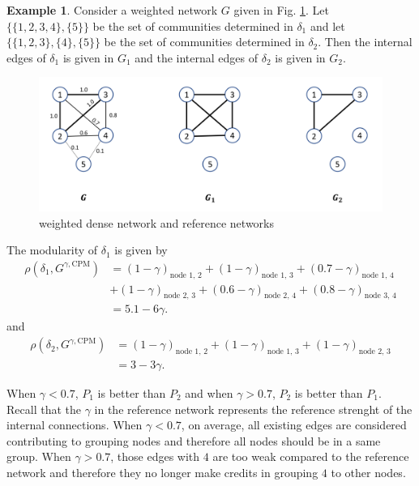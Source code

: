 \documentclass[11pt]{article}
\theoremstyle{definition}
\theoremstyle{definition}
\newtheorem{eg}{Example}
\theoremstyle{definition}
\theoremstyle{remark}
\theoremstyle{plain}
\begin{document}
\begin{eg}\label{eg:weighted-network-CPM}
	Consider a weighted network $G$ given in Fig. \ref{fig:weighted-network}. Let $\{\{1,2,3,4\}, \{5\}\}$ be the set of communities determined in $\delta_1$ and let $\{\{1,2,3\}, \{4\}, \{5\}\}$ be the set of communities determined in $\delta_2$. Then the internal edges of $\delta_1$ is given in $G_1$ and the internal edges of $\delta_2$ is given in $G_2$.

	\begin{figure}[!h]
		\centering
		\includegraphics*[width=.8\textwidth]{weighted-network.PNG}
		\caption{weighted dense network and reference networks}
		\label{fig:weighted-network}
	\end{figure}


	The modularity of $\delta_1$ is given by
	\[
		\begin{aligned}
			\rho(\delta_1, G^{\gamma, \text{CPM}}) &= (1 - \gamma)_{\text{node 1, 2}} + (1 - \gamma)_{\text{node 1, 3}} + (0.7 - \gamma)_{\text{node 1, 4}}\\
			&+(1 - \gamma)_{\text{node 2, 3}}+(0.6 - \gamma)_{\text{node 2, 4}} + (0.8 - \gamma)_{\text{node 3, 4}}\\
			& = 5.1 - 6\gamma.
		\end{aligned}
	\]
	and
	\[
		\begin{aligned}
			\rho(\delta_2, G^{\gamma, \text{CPM}}) &= (1 - \gamma)_{\text{node 1, 2}} + (1 - \gamma)_{\text{node 1, 3}} + (1 - \gamma)_{\text{node 2, 3}}\\
			& = 3 - 3\gamma.
		\end{aligned}
	\]

	When $\gamma < 0.7$, $P_1$ is better than $P_2$ and when $\gamma > 0.7$, $P_2$ is better than $P_1$. Recall that the $\gamma$ in the reference network represents the reference strenght of the internal connections. When $\gamma < 0.7$, on average, all existing edges are considered contributing to grouping nodes and therefore all nodes should be in a same group. When $\gamma > 0.7$, those edges with $4$ are too weak compared to the reference network and therefore they no longer make credits in grouping $4$ to other nodes.
\end{eg}
\end{document}
